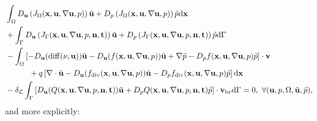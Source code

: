 \documentclass[oneside,11pt]{book}
\numberwithin{equation}{section}
\begin{document}
\begin{align*}
    &\int_\Omega D_{\bf u}\left(J_\Omega({\bf x},{\bf u},\nabla{\bf u},p)\right)\tilde{\bf u} + D_p\left(J_\Omega({\bf x},{\bf u},\nabla{\bf u},p)\right)\tilde{p}{\rm d}{\bf x}\\
    &+ \int_\Gamma D_{\bf u}\left(J_\Gamma({\bf x},{\bf u},\nabla{\bf u},p,{\bf n},{\bf t})\right)\tilde{\bf u} + D_p\left(J_\Gamma({\bf x},{\bf u},\nabla{\bf u},p,{\bf n},{\bf t})\right)\tilde{p}{\rm d}\Gamma\\
    &-\int_\Omega \left[-D_{\bf u}(\operatorname{diff}(\nu,{\bf u}))\tilde{\bf u} - D_{\bf u}(f({\bf x},{\bf u},\nabla{\bf u},p))\tilde{\bf u} + \nabla\tilde{p} - D_pf({\bf x},{\bf u},\nabla{\bf u},p)\tilde{p}\right]\cdot{\bf v}\\
    &\hspace{1.05cm}+ q\left[\nabla\cdot\tilde{\bf u} - D_{\bf u}(f_{\rm div}({\bf x},{\bf u},\nabla{\bf u},p))\tilde{\bf u} - D_pf_{\rm div}({\bf x},{\bf u},\nabla{\bf u},p)\tilde{p}\right]{\rm d}{\bf x}\\
    &-\delta_{\mathcal{L}}\int_\Gamma \left[D_{\bf u}(Q({\bf x},{\bf u},\nabla{\bf u},p,{\bf n},{\bf t}))\tilde{\bf u} + D_pQ({\bf x},{\bf u},\nabla{\bf u},p,{\bf n},{\bf t})\tilde{p}\right]\cdot{\bf v}_{\rm bc}{\rm d}\Gamma = 0,\ \forall({\bf u},p,\Omega,\tilde{\bf u},\tilde{p}),
\end{align*}
and more explicitly:
\end{document}
